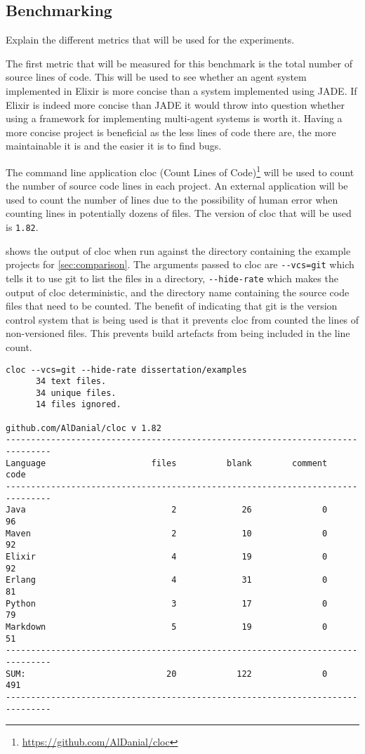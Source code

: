 \subsection{Benchmarking}

Explain the different metrics that will be used for the experiments.

The first metric that will be measured for this benchmark is the total number of source lines of code.
This will be used to see whether an agent system implemented in Elixir is more concise than a system implemented using JADE\@.
If Elixir is indeed more concise than JADE it would throw into question whether using a framework for implementing multi-agent systems is worth it.
Having a more concise project is beneficial as the less lines of code there are, the more maintainable it is and the easier it is to find bugs.

The command line application cloc (Count Lines of Code)\footnote{\url{https://github.com/AlDanial/cloc}} will be used to count the number of source code lines in each project.
An external application will be used to count the number of lines due to the possibility of human error when counting lines in potentially dozens of files.
The version of cloc that will be used is \verb|1.82|.

 shows the output of cloc when run against the directory containing the example projects for \cref{sec:comparison}.
The arguments passed to cloc are \verb|--vcs=git| which tells it to use git to list the files in a directory, \verb|--hide-rate| which makes the output of cloc deterministic, and the directory name containing the source code files that need to be counted.
The benefit of indicating that git is the version control system that is being used is that it prevents cloc from counted the lines of non-versioned files.
This prevents build artefacts from being included in the line count.

\begin{lstlisting}[numbers=none,float=h,label=lst:cloc,caption=Output of cloc when run on the example projects]
cloc --vcs=git --hide-rate dissertation/examples
      34 text files.
      34 unique files.
      14 files ignored.

github.com/AlDanial/cloc v 1.82
-------------------------------------------------------------------------------
Language                     files          blank        comment           code
-------------------------------------------------------------------------------
Java                             2             26              0             96
Maven                            2             10              0             92
Elixir                           4             19              0             92
Erlang                           4             31              0             81
Python                           3             17              0             79
Markdown                         5             19              0             51
-------------------------------------------------------------------------------
SUM:                            20            122              0            491
-------------------------------------------------------------------------------
\end{lstlisting}

